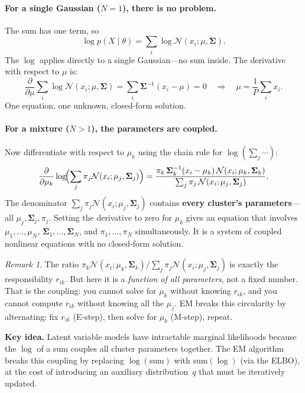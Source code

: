 \documentclass[11pt]{article}
\theoremstyle{definition}
\theoremstyle{plain}
\theoremstyle{remark}
\newtheorem{remark}{Remark}[section]
\newcommand{\Sv}{\boldsymbol{\Sigma}}
\newenvironment{keyidea}{\par\medskip\noindent\textbf{Key idea.} }{\par\medskip}
\begin{document}
\paragraph{For a single Gaussian ($N=1$), there is no problem.} The sum has one term, so
\[
  \log p(X\mid\theta) = \sum_i \log\mathcal{N}(x_i;\mu,\Sv).
\]
The $\log$ applies directly to a single Gaussian---no sum inside. The derivative with respect to $\mu$ is:
\[
  \frac{\partial}{\partial\mu}\sum_i\log\mathcal{N}(x_i;\mu,\Sv) = \sum_i\Sv^{-1}(x_i-\mu)=0 \quad\Longrightarrow\quad \mu = \frac{1}{P}\sum_i x_i.
\]
One equation, one unknown, closed-form solution.

\paragraph{For a mixture ($N>1$), the parameters are coupled.} Now differentiate with respect to $\mu_k$ using the chain rule for $\log(\sum_j\cdots)$:
\begin{equation}
  \frac{\partial}{\partial\mu_k}\log\!\Bigl(\sum_j\pi_j\mathcal{N}(x_i;\mu_j,\Sv_j)\Bigr)
  = \frac{\pi_k\,\Sv_k^{-1}(x_i-\mu_k)\,\mathcal{N}(x_i;\mu_k,\Sv_k)}{\sum_j\pi_j\,\mathcal{N}(x_i;\mu_j,\Sv_j)}.
\end{equation}
The denominator $\sum_j\pi_j\mathcal{N}(x_i;\mu_j,\Sv_j)$ contains \textbf{every cluster's parameters}---all $\mu_j,\Sv_j,\pi_j$. Setting the derivative to zero for $\mu_k$ gives an equation that involves $\mu_1,\dots,\mu_N$, $\Sv_1,\dots,\Sv_N$, and $\pi_1,\dots,\pi_N$ simultaneously. It is a system of coupled nonlinear equations with no closed-form solution.

\begin{remark}
The ratio $\pi_k\mathcal{N}(x_i;\mu_k,\Sv_k)/\sum_j\pi_j\mathcal{N}(x_i;\mu_j,\Sv_j)$ is exactly the responsibility $r_{ik}$. But here it is a \emph{function of all parameters}, not a fixed number. That is the coupling: you cannot solve for $\mu_k$ without knowing $r_{ik}$, and you cannot compute $r_{ik}$ without knowing all the $\mu_j$. EM breaks this circularity by alternating: fix $r_{ik}$ (E-step), then solve for $\mu_k$ (M-step), repeat.
\end{remark}

\begin{keyidea}
Latent variable models have intractable marginal likelihoods because the $\log$ of a sum couples all cluster parameters together. The EM algorithm breaks this coupling by replacing $\log(\text{sum})$ with $\text{sum}(\log)$ (via the ELBO), at the cost of introducing an auxiliary distribution~$q$ that must be iteratively updated.
\end{keyidea}
\end{document}
